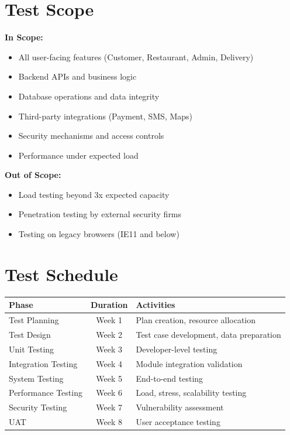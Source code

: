 \documentclass[12pt,a4paper]{report}
\begin{document}
\section{Test Scope}

\textbf{In Scope:}
\begin{itemize}
    \item All user-facing features (Customer, Restaurant, Admin, Delivery)
    \item Backend APIs and business logic
    \item Database operations and data integrity
    \item Third-party integrations (Payment, SMS, Maps)
    \item Security mechanisms and access controls
    \item Performance under expected load
\end{itemize}

\textbf{Out of Scope:}
\begin{itemize}
    \item Load testing beyond 3x expected capacity
    \item Penetration testing by external security firms
    \item Testing on legacy browsers (IE11 and below)
\end{itemize}

\section{Test Schedule}

\begin{longtable}{|p{3.5cm}|c|p{6cm}|}
\hline
\textbf{Phase} & \textbf{Duration} & \textbf{Activities} \\
\hline
\endfirsthead
Test Planning & Week 1 & Plan creation, resource allocation \\
\hline
Test Design & Week 2 & Test case development, data preparation \\
\hline
Unit Testing & Week 3 & Developer-level testing \\
\hline
Integration Testing & Week 4 & Module integration validation \\
\hline
System Testing & Week 5 & End-to-end testing \\
\hline
Performance Testing & Week 6 & Load, stress, scalability testing \\
\hline
Security Testing & Week 7 & Vulnerability assessment \\
\hline
UAT & Week 8 & User acceptance testing \\
\hline
\end{longtable}
\end{document}
